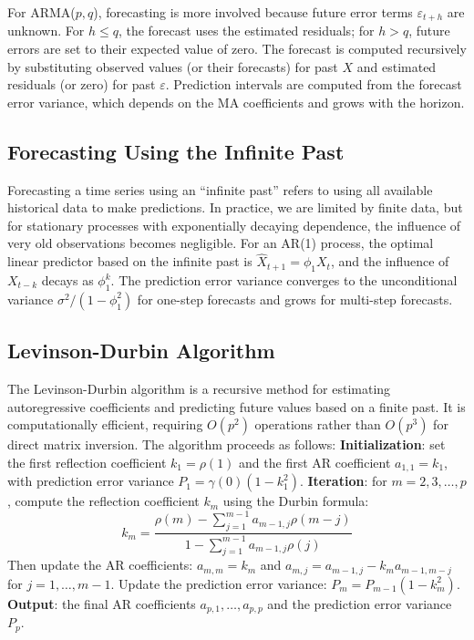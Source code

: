 \documentclass[11pt,a4paper]{article}
\begin{document}
For ARMA($p,q$), forecasting is more involved because future error terms $\varepsilon_{t+h}$ are unknown. For $h \leq q$, the forecast uses the estimated residuals; for $h > q$, future errors are set to their expected value of zero. The forecast is computed recursively by substituting observed values (or their forecasts) for past $X$ and estimated residuals (or zero) for past $\varepsilon$. Prediction intervals are computed from the forecast error variance, which depends on the MA coefficients and grows with the horizon.

\subsection{Forecasting Using the Infinite Past}

Forecasting a time series using an ``infinite past'' refers to using all available historical data to make predictions. In practice, we are limited by finite data, but for stationary processes with exponentially decaying dependence, the influence of very old observations becomes negligible. For an AR(1) process, the optimal linear predictor based on the infinite past is $\hat{X}_{t+1} = \phi_1 X_t$, and the influence of $X_{t-k}$ decays as $\phi_1^k$. The prediction error variance converges to the unconditional variance $\sigma^2/(1-\phi_1^2)$ for one-step forecasts and grows for multi-step forecasts.

\subsection{Levinson-Durbin Algorithm}

The Levinson-Durbin algorithm is a recursive method for estimating autoregressive coefficients and predicting future values based on a finite past. It is computationally efficient, requiring $O(p^2)$ operations rather than $O(p^3)$ for direct matrix inversion. The algorithm proceeds as follows: \textbf{Initialization}: set the first reflection coefficient $k_1 = \rho(1)$ and the first AR coefficient $a_{1,1} = k_1$, with prediction error variance $P_1 = \gamma(0)(1 - k_1^2)$. \textbf{Iteration}: for $m = 2, 3, \ldots, p$, compute the reflection coefficient $k_m$ using the Durbin formula:
\[
k_m = \frac{\rho(m) - \sum_{j=1}^{m-1} a_{m-1,j} \rho(m-j)}{1 - \sum_{j=1}^{m-1} a_{m-1,j} \rho(j)}
\]
Then update the AR coefficients: $a_{m,m} = k_m$ and $a_{m,j} = a_{m-1,j} - k_m a_{m-1,m-j}$ for $j = 1, \ldots, m-1$. Update the prediction error variance: $P_m = P_{m-1}(1 - k_m^2)$. \textbf{Output}: the final AR coefficients $a_{p,1}, \ldots, a_{p,p}$ and the prediction error variance $P_p$.
\end{document}

